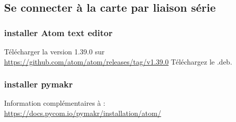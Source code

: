 \documentclass{article}
\begin{document}

\subsection{Se connecter à la carte par liaison série}


\subsubsection{installer Atom text editor}




Télécharger la version 1.39.0 sur \url{https://github.com/atom/atom/releases/tag/v1.39.0}
Téléchargez le .deb.






\subsubsection{installer pymakr}
Information complémentaires à : \url{https://docs.pycom.io/pymakr/installation/atom/}
\end{document}
